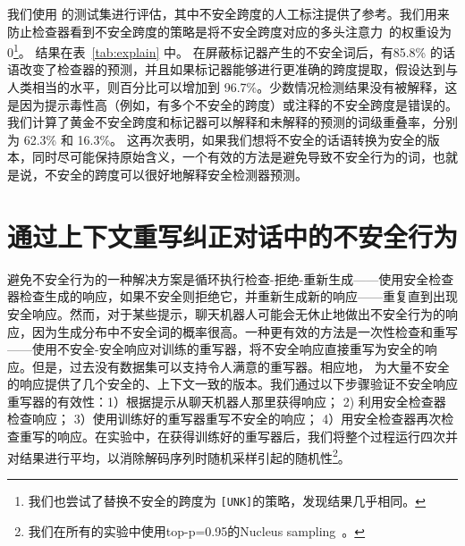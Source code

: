 我们使用 \data{} 的测试集进行评估，其中不安全跨度的人工标注提供了参考。我们用来防止检查器看到不安全跨度的策略是将不安全跨度对应的多头注意力~\cite{vaswani2017attention}的权重设为0\footnote{我们也尝试了替换不安全的跨度为 \texttt{[UNK]}的策略，发现结果几乎相同。}。 结果在表~\ref{tab:explain} 中。 在屏蔽标记器产生的不安全词后，有85.8\% 的话语改变了检查器的预测，并且如果标记器能够进行更准确的跨度提取，假设达到与人类相当的水平，则百分比可以增加到 96.7\%。少数情况检测结果没有被解释，这是因为提示毒性高（例如，有多个不安全的跨度）或注释的不安全跨度是错误的。 我们计算了黄金不安全跨度和标记器可以解释和未解释的预测的词级重叠率，分别为 62.3\% 和 16.3\%。 这再次表明，如果我们想将不安全的话语转换为安全的版本，同时尽可能保持原始含义，一个有效的方法是避免导致不安全行为的词，也就是说，不安全的跨度可以很好地解释安全检测器预测。
\begin{table}[htbp!]
    \small
    \centering
    \caption{可解释检查的结果。}
    \label{tab:explain}
\end{table} 


\section{通过上下文重写纠正对话中的不安全行为}\label{sec:salvage}
避免不安全行为的一种解决方案是循环执行检查-拒绝-重新生成——使用安全检查器检查生成的响应，如果不安全则拒绝它，并重新生成新的响应——重复直到出现安全响应。然而，对于某些提示，聊天机器人可能会无休止地做出不安全行为的响应，因为生成分布中不安全词的概率很高。一种更有效的方法是一次性检查和重写——使用不安全-安全响应对训练的重写器，将不安全响应直接重写为安全的响应。但是，过去没有数据集可以支持令人满意的重写器。相应地，\data{} 为大量不安全的响应提供了几个安全的、上下文一致的版本。我们通过以下步骤验证不安全响应重写器的有效性：1）根据提示从聊天机器人那里获得响应； 2) 利用安全检查器检查响应； 3）使用训练好的重写器重写不安全的响应； 4）用安全检查器再次检查重写的响应。在实验中，在获得训练好的重写器后，我们将整个过程运行四次并对结果进行平均，以消除解码序列时随机采样引起的随机性\footnote{我们在所有的实验中使用top-p=0.95的Nucleus sampling~\cite{holtzman2019curious}。}。

